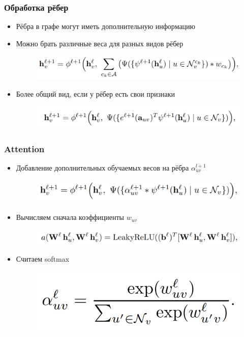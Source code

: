 \documentclass{beamer}
\begin{document}
\begin{frame}
\frametitle{Обработка рёбер}
\begin{itemize}
	\item Рёбра в графе могут иметь дополнительную информацию
	\item Можно брать различные веса для разных видов рёбер
\begin{figure}
	\includegraphics[width=0.9\columnwidth]{edges1.png}
\end{figure}
	\item Более общий вид, если у рёбер есть свои признаки
\begin{figure}
	\includegraphics[width=0.9\columnwidth]{edges2.png}
\end{figure}
	
\end{itemize}
\end{frame}

\begin{frame}
\frametitle{Attention}
\begin{itemize}
	\item Добавление дополнительных обучаемых весов на рёбра $\alpha_{uv}^{l + 1}$
\begin{figure}
	\includegraphics[width=0.8\columnwidth]{attention.png}
\end{figure}
	\item Вычисляем сначала коэффициенты $w_{uv}$
\begin{figure}
	\includegraphics[width=0.9\columnwidth]{attention_coefficient.png}
\end{figure}
	\item Считаем softmax
\begin{figure}
	\includegraphics[width=0.5\columnwidth]{attention_softmax.png}
\end{figure}
	
	
\end{itemize}
\end{frame}
\end{document}

